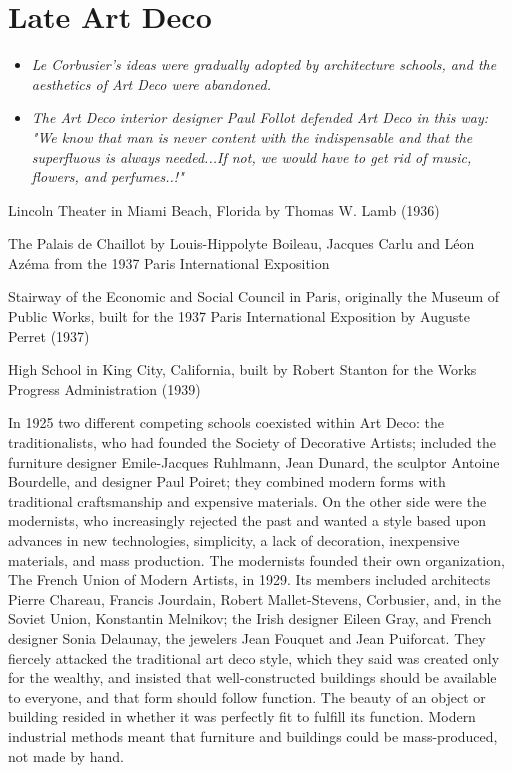 \section{Late Art Deco}\label{late-art-deco}

\begin{itemize}
\item
  \emph{Le Corbusier's ideas were gradually adopted by architecture
  schools, and the aesthetics of Art Deco were abandoned.}
\item
  \emph{The Art Deco interior designer Paul Follot defended Art Deco in
  this way: "We know that man is never content with the indispensable
  and that the superfluous is always needed...If not, we would have to
  get rid of music, flowers, and perfumes..!"}
\end{itemize}

Lincoln Theater in Miami Beach, Florida by Thomas W. Lamb (1936)

The Palais de Chaillot by Louis-Hippolyte Boileau, Jacques Carlu and
Léon Azéma from the 1937 Paris International Exposition

Stairway of the Economic and Social Council in Paris, originally the
Museum of Public Works, built for the 1937 Paris International
Exposition by Auguste Perret (1937)

High School in King City, California, built by Robert Stanton for the
Works Progress Administration (1939)

In 1925 two different competing schools coexisted within Art Deco: the
traditionalists, who had founded the Society of Decorative Artists;
included the furniture designer Emile-Jacques Ruhlmann, Jean Dunard, the
sculptor Antoine Bourdelle, and designer Paul Poiret; they combined
modern forms with traditional craftsmanship and expensive materials. On
the other side were the modernists, who increasingly rejected the past
and wanted a style based upon advances in new technologies, simplicity,
a lack of decoration, inexpensive materials, and mass production. The
modernists founded their own organization, The French Union of Modern
Artists, in 1929. Its members included architects Pierre Chareau,
Francis Jourdain, Robert Mallet-Stevens, Corbusier, and, in the Soviet
Union, Konstantin Melnikov; the Irish designer Eileen Gray, and French
designer Sonia Delaunay, the jewelers Jean Fouquet and Jean Puiforcat.
They fiercely attacked the traditional art deco style, which they said
was created only for the wealthy, and insisted that well-constructed
buildings should be available to everyone, and that form should follow
function. The beauty of an object or building resided in whether it was
perfectly fit to fulfill its function. Modern industrial methods meant
that furniture and buildings could be mass-produced, not made by hand.

